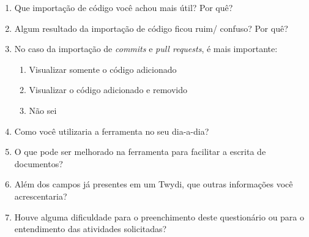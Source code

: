 \begin{enumerate}
  \item \hspace{1pt} Que importação de código você achou mais útil? Por quê?

  \item \hspace{1pt} Algum resultado da importação de código ficou ruim/ confuso? Por quê?

  \item \hspace{1pt} No caso da importação de \textit{commits} e \textit{pull requests}, é mais importante:
  \begin{enumerate}
    \item \hspace{1pt} Visualizar somente o código adicionado
    \item \hspace{1pt} Visualizar o código adicionado e removido
    \item \hspace{1pt} Não sei
  \end{enumerate}

  \item \hspace{1pt} Como você utilizaria a ferramenta no seu dia-a-dia?

  \item \hspace{1pt} O que pode ser melhorado na ferramenta para facilitar a escrita de documentos?

  \item \hspace{1pt} Além dos campos já presentes em um Twydi, que outras informações você acrescentaria?

  \item \hspace{1pt} Houve alguma dificuldade para o preenchimento deste questionário ou para o entendimento das atividades solicitadas?
\end{enumerate}
